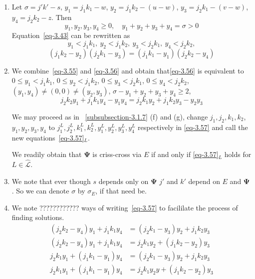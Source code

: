 \documentclass[a4paper,12pt]{article}
\theoremstyle{definition}
\theoremstyle{underlinethm}
\theoremstyle{definition}
\begin{document}
\begin{enumerate}[label =(\alph*)]

\item Let $\sigma = j' k'-s$, $y_{1} = j_{1}k_{1}-w$, $y_{2}= j_{1}k_{2}-(u-w)$, $y_{3} = j_{2}k_{1}-(v-w)$, $y_{4} = j_{2} k_{2}-z$. Then 
\begin{equation}
y_{1}, y_{2}, y_{3}, y_{4} \geq 0,\quad y_{1} + y_{2} + y_{3} + y_{4} = \sigma > 0\tag{3.55}\label{eq-3.55}
\end{equation}
Equation~\eqref{eq-3.43} can be rewritten as
$$
y_{1} < j_{1} k_{1},~ y_{2} < j_{1}k_{2},~ y_{3} < j_{2}k_{1},~ y_{4} < j_{2}k_{2},
$$
\begin{equation}
(j_{1}k_{2} -y_{2})(j_{2} k_{1} - y_{3}) = (j_{1}k_{1}-y_{1})(j_{2}k_{2}-y_{4})\tag{3.56}\label{eq-3.56}
\end{equation}

\item We combine~\eqref{eq-3.55} and \eqref{eq-3.56} and obtain that\eqref{eq-3.56} is equivalent to $0 \leq y_{1} < j_{1} k_{1}$, $0 \leq y_{2} < j_{1} k_{2}$, $0 \leq y_{3} < j_{2} k_{1}$, $ 0 \leq y_{4} < j_{2} k_{2}$, $\left(y_{1}, y_{4}\right) \neq (0,0) \neq \left(y_{2}, y_{3}\right)$, $\sigma - y_{1} + y_{2} + y_{3} + y_{4} \geq 2$, 
\begin{equation}
j_{2}k_{2}y_{1} + j_{1} k_{1} y_{4} - y_{1}y_{4} = j_{2} k_{1} y_{2} + j_{1} k_{2} y_{3} - y_{2}y_{3}\tag{3.57}\label{eq-3.57}
\end{equation}

We may proceed as in ~\eqref{subsubsection-3.1.7} (f) and (g), change $j_{1}, j_{2}, k_{1}, k_{2}$, $y_{1}, y_{2}, y_{3}, y_{4}$ to $j_{1}^{L}, j_{2}^{L}, k_{1}^{L}, k_{2}^{L}, y_{1}^{L}, y_{2}^{L}, y_{3}^{L}, y_{4}^{L}$ respectively in \eqref{eq-3.57} and call the new equations~\eqref{eq-3.57}$_{L}$.

We readily obtain that $\boldsymbol{\Psi}$ is criss-cross via $E$ if and only if \eqref{eq-3.57}$_{L}$ holds for $L \in \hat{\mathcal{L}}$.

\item We note that ever though $s$ depends only on $\boldsymbol{\Psi}$ $j'$ and $k'$ depend on $E$ and $\boldsymbol{\Psi}$. So we can denote $\sigma$ by $\sigma_{E}$, if that need be.

\item We note ???????????? ways of writing~\eqref{eq-3.57} to facililate the process of finding solutions.
\begin{align*}
\left(j_{2}k_{2} - y_{4} \right)y_{1} + j_{1}k_{1} y_{4} & =\left(j_{2}k_{1}-y_{3}\right)y_{2} + j_{1}k_{2}y_{3}\tag{3.58}\label{eq-3.58}\\
\left(j_{2}k_{2} - y_{4} \right)y_{1} + j_{1} k_{1} y_{4} &= j_{2}k_{1}y_{2} + \left(j_{1} k_{2} -y_{2} \right)y_{3} \tag{3.59}\label{eq-3.59}\\
j_{2}k_{1}y_{1} + \left(j_{1}k_{1}-y_{1}\right)y_{4} &= \left(j_{2}k_{1} -y_{3}\right)y_{2} + j_{1}k_{2}y_{3}\tag{3.60}\label{eq-3.60}\\
j_{2}k_{1}y_{1} + \left(j_{1}k_{1}-y_{1} \right)y_{4} &= j_{2}k_{1}y_{2}y + \left(j_{1}k_{2}-y_{2}\right)y_{3}\tag{3.61}\label{eq-3.61}
\end{align*}
\end{enumerate} 
\end{document}
